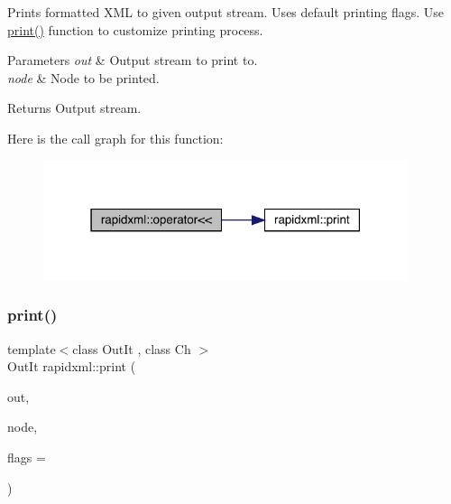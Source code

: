 Prints formatted X\+ML to given output stream. Uses default printing flags. Use \mbox{\hyperlink{namespacerapidxml_a0fb0be6eba49fb2e2646d5a72a0dc355}{print()}} function to customize printing process.
\begin{DoxyParams}{Parameters}
{\em out} & Output stream to print to.\\
\hline
{\em node} & Node to be printed. \\
\hline
\end{DoxyParams}
\begin{DoxyReturn}{Returns}
Output stream. 
\end{DoxyReturn}
Here is the call graph for this function\+:\nopagebreak
\begin{figure}[H]
\begin{center}
\leavevmode
\includegraphics[width=303pt]{namespacerapidxml_a9ed8e626dd81348caede1f92a6c8418a_cgraph}
\end{center}
\end{figure}
\mbox{\label{namespacerapidxml_a0fb0be6eba49fb2e2646d5a72a0dc355}} 
\subsubsection{\texorpdfstring{print()}{print()}\hspace{0.1cm}{\footnotesize\ttfamily [1/2]}}
{\footnotesize\ttfamily template$<$class Out\+It , class Ch $>$ \\
Out\+It rapidxml\+::print (\begin{DoxyParamCaption}\item[{Out\+It}]{out,  }\item[{const \mbox{\hyperlink{classrapidxml_1_1xml__node}{xml\+\_\+node}}$<$ Ch $>$ \&}]{node,  }\item[{int}]{flags = {} }\end{DoxyParamCaption})\hspace{0.3cm}{\ttfamily [inline]}}

